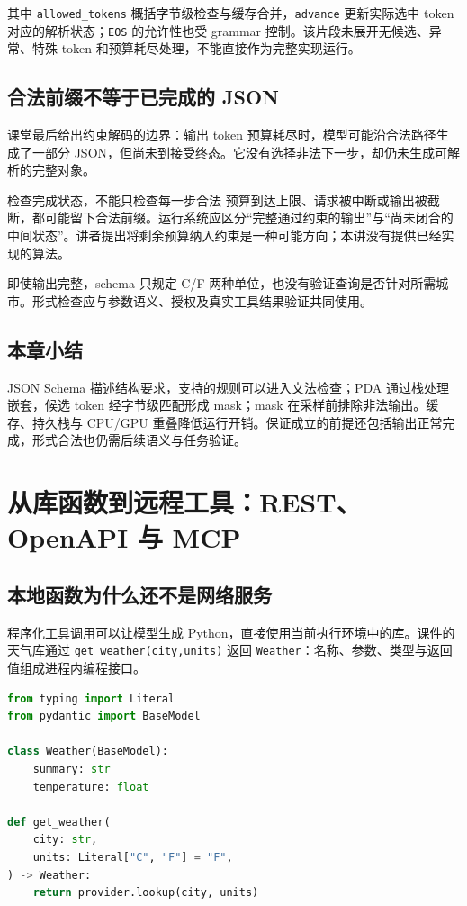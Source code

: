 \documentclass[11pt,a4paper]{article}
\begin{document}
其中 \texttt{allowed\_tokens} 概括字节级检查与缓存合并，\texttt{advance} 更新实际选中 token 对应的解析状态；\texttt{EOS} 的允许性也受 grammar 控制。该片段未展开无候选、异常、特殊 token 和预算耗尽处理，不能直接作为完整实现运行。

\subsection{合法前缀不等于已完成的 JSON}
课堂最后给出约束解码的边界：输出 token 预算耗尽时，模型可能沿合法路径生成了一部分 JSON，但尚未到接受终态。它没有选择非法下一步，却仍未生成可解析的完整对象。

\begin{warningbox}{检查完成状态，不能只检查每一步合法}
预算到达上限、请求被中断或输出被截断，都可能留下合法前缀。运行系统应区分“完整通过约束的输出”与“尚未闭合的中间状态”。讲者提出将剩余预算纳入约束是一种可能方向；本讲没有提供已经实现的算法。
\end{warningbox}

即使输出完整，schema 只规定 C/F 两种单位，也没有验证查询是否针对所需城市。形式检查应与参数语义、授权及真实工具结果验证共同使用。

\subsection{本章小结}
JSON Schema 描述结构要求，支持的规则可以进入文法检查；PDA 通过栈处理嵌套，候选 token 经字节级匹配形成 mask；mask 在采样前排除非法输出。缓存、持久栈与 CPU/GPU 重叠降低运行开销。保证成立的前提还包括输出正常完成，形式合法也仍需后续语义与任务验证。

\clearpage
\section{从库函数到远程工具：REST、OpenAPI 与 MCP}
\subsection{本地函数为什么还不是网络服务}
程序化工具调用可以让模型生成 Python，直接使用当前执行环境中的库。课件的天气库通过 \texttt{get\_weather(city,units)} 返回 \texttt{Weather}：名称、参数、类型与返回值组成进程内编程接口。

\noindent\begin{minipage}{\textwidth}
\begin{lstlisting}[caption={课件节选：进程内的天气库接口},language=Python]
from typing import Literal
from pydantic import BaseModel

class Weather(BaseModel):
    summary: str
    temperature: float

def get_weather(
    city: str,
    units: Literal["C", "F"] = "F",
) -> Weather:
    return provider.lookup(city, units)
\end{lstlisting}
\end{minipage}
\end{document}
